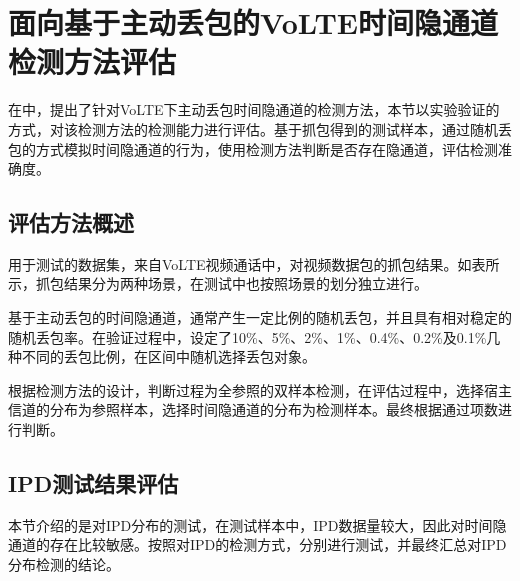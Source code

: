 \section{面向基于主动丢包的VoLTE时间隐通道检测方法评估}
\label{chap:analyze:result}

在中，提出了针对VoLTE下主动丢包时间隐通道的检测方法，本节以实验验证的方式，对该检测方法的检测能力进行评估。基于抓包得到的测试样本，通过随机丢包的方式模拟时间隐通道的行为，使用检测方法判断是否存在隐通道，评估检测准确度。

\subsection{评估方法概述}
\label{chap:analyze:result:abstract}

用于测试的数据集，来自VoLTE视频通话中，对视频数据包的抓包结果。如表所示，抓包结果分为两种场景，在测试中也按照场景的划分独立进行。

基于主动丢包的时间隐通道，通常产生一定比例的随机丢包，并且具有相对稳定的随机丢包率。在验证过程中，设定了10\%、5\%、2\%、1\%、0.4\%、0.2\%及0.1\%几种不同的丢包比例，在区间中随机选择丢包对象。

根据检测方法的设计，判断过程为全参照的双样本检测，在评估过程中，选择宿主信道的分布为参照样本，选择时间隐通道的分布为检测样本。最终根据通过项数进行判断。

\subsection{IPD测试结果评估}
\label{chap:analyze:result:ipd}

本节介绍的是对IPD分布的测试，在测试样本中，IPD数据量较大，因此对时间隐通道的存在比较敏感。按照对IPD的检测方式，分别进行测试，并最终汇总对IPD分布检测的结论。

